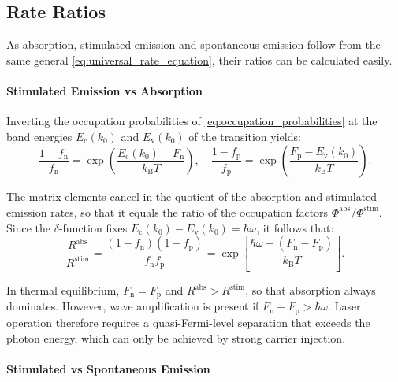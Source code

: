 \subsection{Rate Ratios}
\label{sec:rate_ratios}

As absorption, stimulated emission and spontaneous emission follow from the same
general \cref{eq:universal_rate_equation}, their ratios can be calculated easily.

\paragraph{Stimulated Emission vs Absorption}

Inverting the occupation probabilities of \cref{eq:occupation_probabilities} at the
band energies $E_{\mathrm{c}}(k_{0})$ and $E_{\mathrm{v}}(k_{0})$ of the transition yields:
\begin{equation}
	\frac{1-f_{\mathrm{n}}}{f_{\mathrm{n}}}=\exp\left(\frac{E_{\mathrm{c}}(k_{0})-F_{\mathrm{n}}}{k_{\mathrm{B}}T}\right),\quad \frac{1-f_{\mathrm{p}}}{f_{\mathrm{p}}}=\exp\left(\frac{F_{\mathrm{p}}-E_{\mathrm{v}}(k_{0})}{k_{\mathrm{B}}T}\right).
	\label{eq:f_n_identity}
\end{equation}

The matrix elements cancel in the quotient of the absorption and stimulated-emission
rates, so that it equals the ratio of the occupation factors
$\Phi^{\mathrm{abs}}/\Phi^{\mathrm{stim}}$. Since the $\delta$-function fixes $E_{\mathrm{c}}(k_{0})
-E_{\mathrm{v}}(k_{0})=\hbar\omega$, it follows that:
\begin{equation}
	\frac{R^{\mathrm{abs}}}{R^{\mathrm{stim}}}=\frac{(1-f_{\mathrm{n}})(1-f_{\mathrm{p}})}{f_{\mathrm{n}}f_{\mathrm{p}}}
	=\exp\left[\frac{\hbar\omega-(F_{\mathrm{n}}-F_{\mathrm{p}})}{k_{\mathrm{B}}T}\right
	]. \label{eq:abs_stim_rate}
\end{equation}

In thermal equilibrium, $F_{\mathrm{n}}=F_{\mathrm{p}}$ and $R^{\mathrm{abs}}> R^{\mathrm{stim}}$,
so that absorption always dominates. However, wave amplification is present if
$F_{\mathrm{n}}-F_{\mathrm{p}}>\hbar\omega$. Laser operation therefore requires a quasi-Fermi-level separation that
exceeds the photon energy, which can only be achieved by strong carrier injection.

\paragraph{Stimulated vs Spontaneous Emission}

